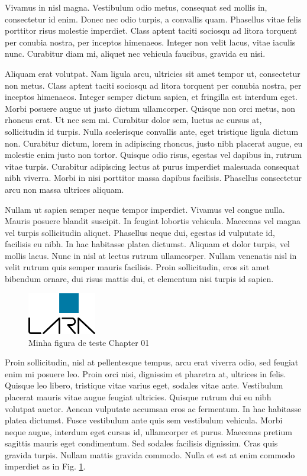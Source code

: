 Vivamus in nisl magna. Vestibulum odio metus, consequat sed mollis
in, consectetur id enim. Donec nec odio turpis, a convallis quam.
Phasellus vitae felis porttitor risus molestie imperdiet. Class aptent
taciti sociosqu ad litora torquent per conubia nostra, per inceptos
himenaeos. Integer non velit lacus, vitae iaculis nunc. Curabitur
diam mi, aliquet nec vehicula faucibus, gravida eu nisi.

Aliquam erat volutpat. Nam ligula arcu, ultricies sit amet tempor
ut, consectetur non metus. Class aptent taciti sociosqu ad litora
torquent per conubia nostra, per inceptos himenaeos. Integer semper
dictum sapien, et fringilla est interdum eget. Morbi posuere augue
ut justo dictum ullamcorper. Quisque non orci metus, non rhoncus erat.
Ut nec sem mi. Curabitur dolor sem, luctus ac cursus at, sollicitudin
id turpis. Nulla scelerisque convallis ante, eget tristique ligula
dictum non. Curabitur dictum, lorem in adipiscing rhoncus, justo nibh
placerat augue, eu molestie enim justo non tortor. Quisque odio risus,
egestas vel dapibus in, rutrum vitae turpis. Curabitur adipiscing
lectus at purus imperdiet malesuada consequat nibh viverra. Morbi
in nisi porttitor massa dapibus facilisis. Phasellus consectetur arcu
non massa ultrices aliquam.

Nullam ut sapien semper neque tempor imperdiet. Vivamus vel congue
nulla. Mauris posuere blandit suscipit. In feugiat lobortis vehicula.
Maecenas vel magna vel turpis sollicitudin aliquet. Phasellus neque
dui, egestas id vulputate id, facilisis eu nibh. In hac habitasse
platea dictumst. Aliquam et dolor turpis, vel mollis lacus. Nunc in
nisl at lectus rutrum ullamcorper. Nullam venenatis nisl in velit
rutrum quis semper mauris facilisis. Proin sollicitudin, eros sit
amet bibendum ornare, dui risus mattis dui, et elementum nisi turpis
id sapien.

\begin{figure}
\begin{centering}
\includegraphics[width=3cm]{figs/chapt01/lara_logo.png}
\par\end{centering}
\caption{\label{fig:teste_fig_01}Minha figura de teste Chapter 01}
\end{figure}

Proin sollicitudin, nisl at pellentesque tempus, arcu erat viverra
odio, sed feugiat enim mi posuere leo. Proin orci nisi, dignissim
et pharetra at, ultrices in felis. Quisque leo libero, tristique vitae
varius eget, sodales vitae ante. Vestibulum placerat mauris vitae
augue feugiat ultricies. Quisque rutrum dui eu nibh volutpat auctor.
Aenean vulputate accumsan eros ac fermentum. In hac habitasse platea
dictumst. Fusce vestibulum ante quis sem vestibulum vehicula. Morbi
neque augue, interdum eget cursus id, ullamcorper et purus. Maecenas
pretium sagittis mauris eget condimentum. Sed sodales facilisis dignissim.
Cras quis gravida turpis. Nullam mattis gravida commodo. Nulla et
est at enim commodo imperdiet as in Fig. \ref{fig:teste_fig_01}.

